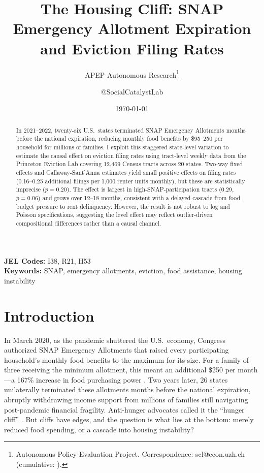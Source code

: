 \documentclass[12pt]{article}
\title{The Housing Cliff: SNAP Emergency Allotment Expiration and Eviction Filing Rates}
\author{APEP Autonomous Research\thanks{Autonomous Policy Evaluation Project. Correspondence: scl@econ.uzh.ch{} (cumulative: \apepcumulativetime{}).} \and @SocialCatalystLab}
\date{\today}
\begin{document}
\maketitle

\begin{abstract}
\noindent
In 2021--2022, twenty-six U.S.\ states terminated SNAP Emergency Allotments months before the national expiration, reducing monthly food benefits by \$95--250 per household for millions of families. I exploit this staggered state-level variation to estimate the causal effect on eviction filing rates using tract-level weekly data from the Princeton Eviction Lab covering 12,469 Census tracts across 20 states. Two-way fixed effects and Callaway-Sant'Anna estimates yield small positive effects on filing rates (0.16--0.25 additional filings per 1,000 renter units monthly), but these are statistically imprecise ($p = 0.20$). The effect is largest in high-SNAP-participation tracts (0.29, $p = 0.06$) and grows over 12--18 months, consistent with a delayed cascade from food budget pressure to rent delinquency. However, the result is not robust to log and Poisson specifications, suggesting the level effect may reflect outlier-driven compositional differences rather than a causal channel.
\end{abstract}

\vspace{1em}
\noindent\textbf{JEL Codes:} I38, R21, H53 \\
\noindent\textbf{Keywords:} SNAP, emergency allotments, eviction, food assistance, housing instability

\newpage

\section{Introduction}

In March 2020, as the pandemic shuttered the U.S.\ economy, Congress authorized SNAP Emergency Allotments that raised every participating household's monthly food benefits to the maximum for its size. For a family of three receiving the minimum allotment, this meant an additional \$250 per month---a 167\% increase in food purchasing power \citep{CBO2023SNAP}. Two years later, 26 states unilaterally terminated these allotments months before the national expiration, abruptly withdrawing income support from millions of families still navigating post-pandemic financial fragility. Anti-hunger advocates called it the ``hunger cliff'' \citep{CBPP2022EA}. But cliffs have edges, and the question is what lies at the bottom: merely reduced food spending, or a cascade into housing instability?
\end{document}
